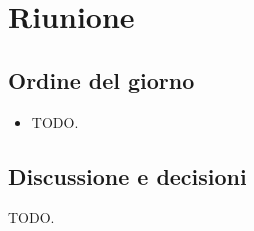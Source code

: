 \section{Riunione}
\subsection{Ordine del giorno}
\begin{itemize}
	\item TODO.
\end{itemize}

\subsection{Discussione e decisioni}
\par TODO.